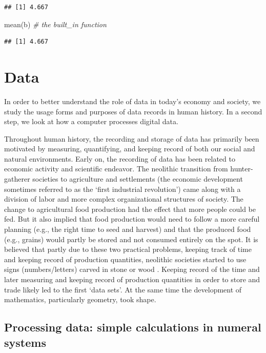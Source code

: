 \documentclass[
  12pt,
]{style/krantz}
\newenvironment{Shaded}{\begin{snugshade}}{\end{snugshade}}
\newcommand{\CommentTok}[1]{\textcolor[rgb]{0.56,0.35,0.01}{\textit{#1}}}
\newcommand{\FunctionTok}[1]{\textcolor[rgb]{0.00,0.00,0.00}{#1}}
\newcommand{\NormalTok}[1]{#1}
\begin{document}
\begin{verbatim}
## [1] 4.667
\end{verbatim}

\begin{Shaded}
\begin{Highlighting}[]
\FunctionTok{mean}\NormalTok{(b) }\CommentTok{\# the built\_in function}
\end{Highlighting}
\end{Shaded}

\begin{verbatim}
## [1] 4.667
\end{verbatim}

\hypertarget{data}{%
\chapter{Data}\label{data}}

In order to better understand the role of data in today's economy and society, we study the usage forms and purposes of data records in human history. In a second step, we look at how a computer processes digital data.

Throughout human history, the recording and storage of data has primarily been motivated by measuring, quantifying, and keeping record of both our social and natural environments. Early on, the recording of data has been related to economic activity and scientific endeavor. The neolithic transition from hunter-gatherer societies to agriculture and settlements (the economic development sometimes referred to as the `first industrial revolution') came along with a division of labor and more complex organizational structures of society. The change to agricultural food production had the effect that more people could be fed. But it also implied that food production would need to follow a more careful planning (e.g., the right time to seed and harvest) and that the produced food (e.g., grains) would partly be stored and not consumed entirely on the spot. It is believed that partly due to these two practical problems, keeping track of time and keeping record of production quantities, neolithic societies started to use signs (numbers/letters) carved in stone or wood \citep{hogben_1983}. Keeping record of the time and later measuring and keeping record of production quantities in order to store and trade likely led to the first `data sets'. At the same time the development of mathematics, particularly geometry, took shape.

\hypertarget{processing-data-simple-calculations-in-numeral-systems}{%
\section{Processing data: simple calculations in numeral systems}\label{processing-data-simple-calculations-in-numeral-systems}}
\end{document}
